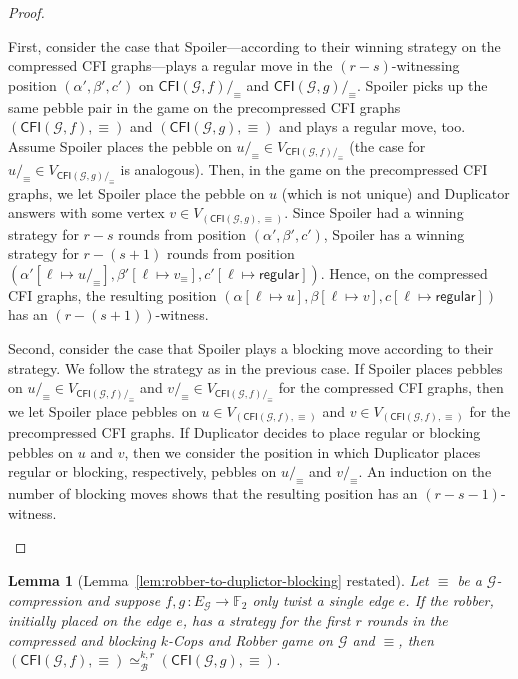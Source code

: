 \documentclass[10pt,a4paper]{article}
\newcommand{\regular}{\mathsf{regular}}
\newcommand{\comp}{\equiv}
\newcommand{\CFIsym}{\mathsf{CFI}}
\newcommand{\CFI}[1]{\CFIsym(#1)}
\newcommand{\compCFI}[2]{\CFI{#1}/_{#2}}
\newcommand{\precompCFI}[2]{{(\CFI{#1},#2)}}
\newcommand{\FF}{\mathbb{F}}
\newcommand{\graphG}{\mathcal{G}}
\newcommand{\edgeG}{E_{\graphG}}
\newcommand{\kbequivr}[2]{\simeq_{\mathcal{B}}^{#1,#2}}
\newtheorem{lemma}[theorem]{Lemma}
\begin{document}
\begin{proof}
\begin{enumerate}
        First, consider the case that Spoiler---according to their winning strategy on the compressed CFI graphs---plays a regular move
        in the $(r-s)$-witnessing position $(\alpha', \beta', c')$
        on $\compCFI{\graphG,f}{\comp}$ and $\compCFI{\graphG,g}{\comp}$.
        Spoiler picks up the same pebble pair in the game on
        the precompressed CFI graphs  $\precompCFI{\graphG,f}{\comp}$ and $\precompCFI{\graphG,g}{\comp}$
        and plays a regular move, too.
        Assume Spoiler places the pebble on $u/_\comp \in V_{\compCFI{\graphG,f}{\comp}}$ (the case for $u/_\comp \in V_{\compCFI{\graphG,g}{\comp}}$ is analogous).
        Then, in the game on the precompressed CFI graphs,
        we let Spoiler place the pebble on $u$ (which is not unique)
        and Duplicator answers with some vertex $v \in V_{\precompCFI{\graphG,g}{\comp}}$. 
        Since Spoiler had a winning strategy for $r-s$ rounds from position $(\alpha', \beta', c')$,
        Spoiler has a winning strategy for $r-(s+1)$ rounds from position
        $(\alpha'[\ell \mapsto u/_\comp], \beta'[\ell \mapsto v_\comp], c'[\ell \mapsto \regular])$.
        Hence, on the compressed CFI graphs, the resulting position $(\alpha[\ell \mapsto u], \beta[\ell \mapsto v], c[\ell\mapsto \regular])$
        has an $(r-(s+1))$-witness.
        
        Second, consider the case that Spoiler plays a blocking move according to their strategy.
        We follow the strategy as in the previous case.
        If Spoiler places pebbles on  $u/_\comp \in V_{\compCFI{\graphG,f}{\comp}}$
        and  $v/_\comp \in V_{\compCFI{\graphG,f}{\comp}}$ for the compressed CFI graphs,
        then we let Spoiler place pebbles on  $u \in V_{\precompCFI{\graphG,f}{\comp}}$
        and  $v \in V_{\precompCFI{\graphG,f}{\comp}}$ for the precompressed CFI graphs.
        If Duplicator decides to place regular or blocking pebbles on $u$ and $v$, then we consider the position in which Duplicator places
        regular or blocking, respectively, pebbles on $u/_\comp$ and $v/_\comp$.
        An induction on the number of blocking moves
        shows that the resulting position has an $(r-s-1)$-witness.
\qedhere
        \end{enumerate}
\end{proof}
 
\begin{lemma}[Lemma~\ref{lem:robber-to-duplictor-blocking} restated] 
        Let $\comp$ be a $\graphG$-compression and 
        suppose $f,g \, \colon \edgeG \to \FF_2$ only twist a single edge $e$.
        If the robber, initially placed on the edge $e$, has a strategy for the first $r$ rounds in the compressed and blocking $k$-Cops and Robber game
        on $\graphG$ and $\comp$, then
        $\precompCFI{\graphG,f}{\comp} \kbequivr{k}{r} \precompCFI{\graphG,g}{\comp}$.
\end{lemma}
\end{document}

